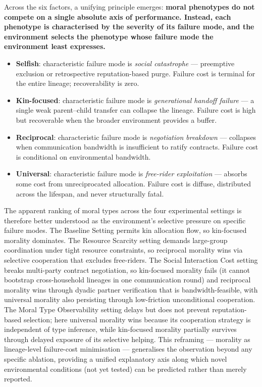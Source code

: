 Across the six factors, a unifying principle emerges: \textbf{moral phenotypes do not compete on a single absolute axis of performance. Instead, each phenotype is characterised by the severity of its failure mode, and the environment selects the phenotype whose failure mode the environment least expresses.}
\begin{itemize}
    \item \textbf{Selfish}: characteristic failure mode is \emph{social catastrophe} --- preemptive exclusion or retrospective reputation-based purge. Failure cost is terminal for the entire lineage; recoverability is zero.
    \item \textbf{Kin-focused}: characteristic failure mode is \emph{generational handoff failure} --- a single weak parent--child transfer can collapse the lineage. Failure cost is high but recoverable when the broader environment provides a buffer.
    \item \textbf{Reciprocal}: characteristic failure mode is \emph{negotiation breakdown} --- collapses when communication bandwidth is insufficient to ratify contracts. Failure cost is conditional on environmental bandwidth.
    \item \textbf{Universal}: characteristic failure mode is \emph{free-rider exploitation} --- absorbs some cost from unreciprocated allocation. Failure cost is diffuse, distributed across the lifespan, and never structurally fatal.
\end{itemize}

The apparent ranking of moral types across the four experimental settings is therefore better understood as the environment's selective pressure on specific failure modes. The Baseline Setting permits kin allocation flow, so kin-focused morality dominates. The Resource Scarcity setting demands large-group coordination under tight resource constraints, so reciprocal morality wins via selective cooperation that excludes free-riders. The Social Interaction Cost setting breaks multi-party contract negotiation, so kin-focused morality fails (it cannot bootstrap cross-household lineages in one communication round) and reciprocal morality wins through dyadic partner verification that is bandwidth-feasible, with universal morality also persisting through low-friction unconditional cooperation. The Moral Type Observability setting delays but does not prevent reputation-based selection; here universal morality wins because its cooperation strategy is independent of type inference, while kin-focused morality partially survives through delayed exposure of its selective helping. This reframing --- morality as lineage-level failure-cost minimisation --- generalises the observation beyond any specific ablation, providing a unified explanatory axis along which novel environmental conditions (not yet tested) can be predicted rather than merely reported.

